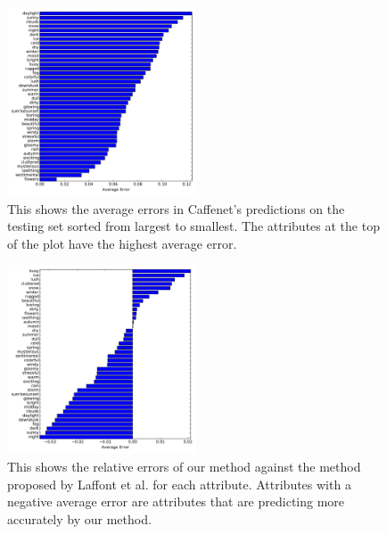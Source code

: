 \documentclass{article}
\begin{document}
%
%
%


\begin{figure}[t]
	\centering
		\includegraphics[width=0.5\textwidth]{figs/sorted_err.pdf}
		\caption{This shows the average errors in Caffenet's predictions on the 
						 testing set sorted from largest to smallest.  The attributes at 
						 the top of the plot have the highest average error.}
		\label{fig:sort}
\end{figure}

\begin{figure}[t]
	\centering
		\includegraphics[width=0.5\textwidth]{figs/rel_err.pdf}
		\caption{This shows the relative errors of our method against the method 
						 proposed by Laffont et al. for each attribute.  Attributes with a 
						 negative average error are attributes that are predicting more 
						 accurately by our method.}
		\label{fig:relerr}
\end{figure}
\end{document}
